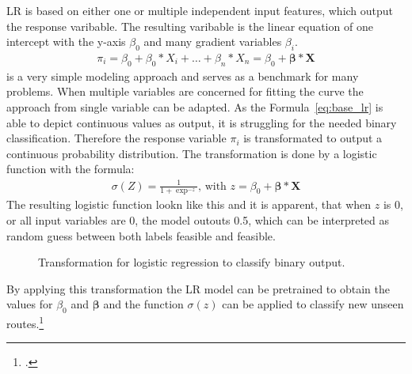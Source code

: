 \gls{LR} is based on either one or multiple independent input features, which output the response varibable. The resulting
varibable is the linear equation of one intercept with the y-axis $\beta_0$ and many gradient variables $\beta_i$.
\begin{align}
    \pi_i=\beta_0+\beta_0*X_i+\dots+\beta_n*X_n = \beta_0 + \bm{\beta} * \bm{X}
    \label{eq:base_lr}
\end{align}
is a very simple modeling approach and serves as a benchmark for many problems. When multiple variables are concerned for
fitting the curve the approach from single variable can be adapted. As the Formula~\ref{eq:base_lr} is able to depict continuous
values as output, it is struggling for the needed binary classification. Therefore the response variable $\pi_i$ is transformated
to output a continuous probability distribution. The transformation is done by a logistic function with the formula:
\begin{align}
    \sigma(Z)=\frac{1}{1+\exp^{-z}},\, \text{with } z = \beta_0 + \bm{\beta} * \bm{X}
    \label{eq:logistic_func}
\end{align}
The resulting logistic function lookn like this and it is apparent, that when $z$ is 0, or all input variables are 0, the model
outouts 0.5, which can be interpreted as random guess between both labels feasible and feasible.
\begin{figure}
    \centering
    \caption{Transformation for logistic regression to classify binary output.}
\end{figure}

By applying this transformation the \gls{LR} model can be pretrained to obtain the values for $\beta_0$ and $\bm{\beta}$ and
the function $\sigma(z)$ can be applied to classify new unseen routes.\footcite[cf.][]{kirasich_random_2018}


